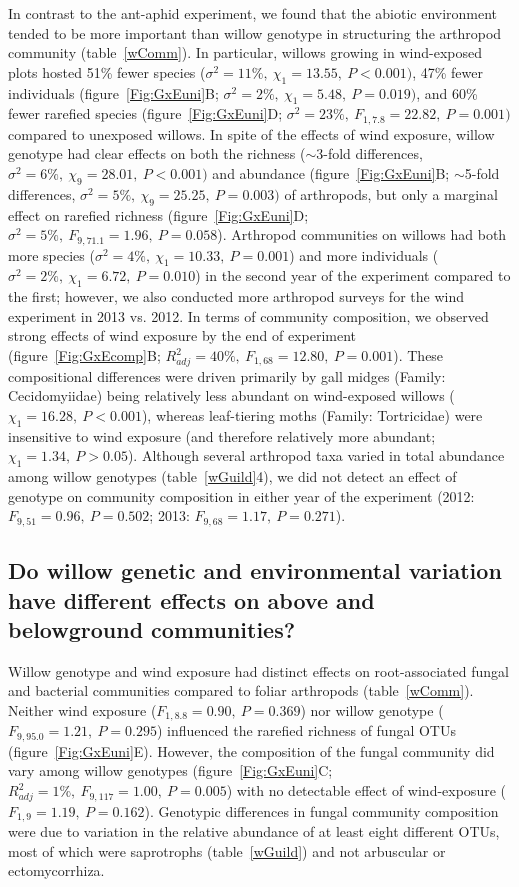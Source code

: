 \documentclass[11pt]{article}
\begin{document}
In contrast to the ant-aphid experiment, we found that the abiotic
environment tended to be more important than willow genotype in
structuring the arthropod community (table~\ref{wComm}). In particular, willows
growing in wind-exposed plots hosted 51\% fewer species
(\(\sigma^2=11\%,\ \chi_1=13.55,\ P<0.001)\), 47\% fewer individuals (figure~\ref{Fig:GxEuni}B; \(\sigma^2=2\%,\ \chi_1=5.48,\ P=0.019)\),
and 60\% fewer rarefied species (figure~\ref{Fig:GxEuni}D; \(\sigma^2=23\%,\ F_{1,7.8}=22.82,\ P=0.001)\) compared to
unexposed willows. In spite of the effects of wind exposure, willow
genotype had clear effects on both the richness ($\sim$3-fold
differences, \(\sigma^2=6\%,\ \chi_9=28.01,\ P<0.001)\) and abundance (figure~\ref{Fig:GxEuni}B;
$\sim$5-fold differences, \(\sigma^2=5\%,\ \chi_9=25.25,\ P=0.003)\) of arthropods,
but only a marginal effect on rarefied richness (figure~\ref{Fig:GxEuni}D;
\(\sigma^2=5\%,\ F_{9,71.1}=1.96,\ P=0.058\)). Arthropod communities on willows had both more
species (\(\sigma^2=4\%,\ \chi_1=10.33,\ P=0.001\)) and more individuals (\(\sigma^2=2\%,\ \chi_1=6.72,\ P=0.010\)) in
the second year of the experiment compared to the first; however, we
also conducted more arthropod surveys for the wind experiment in 2013
vs. 2012. In terms of community composition, we observed strong effects
of wind exposure by the end of experiment (figure~\ref{Fig:GxEcomp}B; \(R_{adj}^2=40\%,\ F_{1,68}=12.80,\ P=0.001\)).
These compositional differences were driven primarily by gall midges
(Family: Cecidomyiidae) being relatively less abundant on wind-exposed
willows (\(\chi_1=16.28,\ P<0.001\)), whereas leaf-tiering moths (Family:
Tortricidae) were insensitive to wind exposure (and therefore relatively
more abundant; \(\chi_1=1.34,\ P>0.05\)). Although several arthropod taxa
varied in total abundance among willow genotypes (table~\ref{wGuild}4), we did not
detect an effect of genotype on community composition in either year of
the experiment (2012: \(F_{9,51}=0.96,\ P=0.502\); 2013: \(F_{9,68}=1.17,\ P=0.271\)).

\subsection*{Do willow genetic and environmental variation have different
effects on above and belowground
communities?}

Willow genotype and wind exposure had distinct effects on
root-associated fungal and bacterial communities compared to foliar
arthropods (table~\ref{wComm}). Neither wind exposure (\(F_{1,8.8}=0.90,\ P=0.369\)) nor
willow genotype (\(F_{9,95.0}=1.21,\ P=0.295\)) influenced the rarefied richness of
fungal OTUs (figure~\ref{Fig:GxEuni}E). However, the composition of the fungal community
did vary among willow genotypes (figure~\ref{Fig:GxEuni}C; \(R_{adj}^2=1\%,\ F_{9,117}=1.00,\ P=0.005\)) with no
detectable effect of wind-exposure (\(F_{1,9}=1.19,\ P=0.162\)). Genotypic
differences in fungal community composition were due to variation in the
relative abundance of at least eight different OTUs, most of which were
saprotrophs (table~\ref{wGuild}) and not arbuscular or ectomycorrhiza.
\end{document}
